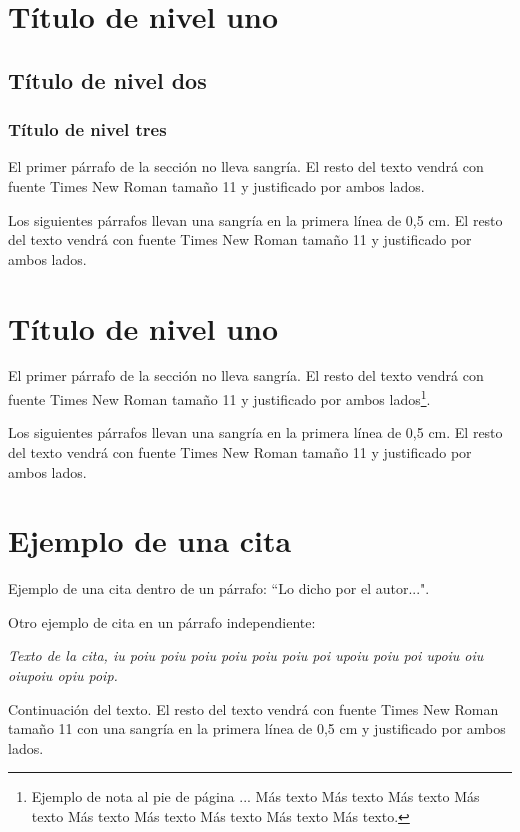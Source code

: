 \documentclass[a4paper,11pt,twocolumn,twoside]{article}
\begin{document}
\section{Título de nivel uno}

\subsection{Título de nivel dos}

\subsubsection{Título de nivel tres}

El primer párrafo de la sección no lleva sangría. El resto del
texto vendrá con fuente Times New Roman tamaño 11 y justificado
por ambos lados.

Los siguientes párrafos llevan una sangría en la primera línea de
0,5 cm. El resto del texto vendrá con fuente Times New Roman
tamaño 11 y justificado por ambos lados.


\section{Título de nivel uno}

El primer párrafo de la sección no lleva sangría. El resto del
texto vendrá con fuente Times New Roman tamaño 11 y justificado
por ambos lados\footnote{Ejemplo de nota al pie de página ... Más
texto Más texto Más texto Más texto Más texto Más texto Más texto
Más texto Más texto.}.

Los siguientes párrafos llevan una sangría en la primera línea de
0,5 cm. El resto del texto vendrá con fuente Times New Roman
tamaño 11 y justificado por ambos lados.

\section{Ejemplo de una cita}

Ejemplo de una cita dentro de un párrafo: ``Lo dicho por el
autor...".

Otro ejemplo de cita en un párrafo independiente:

\parbox{6.5cm}{\textit{Texto de la cita, iu poiu poiu poiu poiu poiu poiu poi
upoiu poiu poi upoiu oiu oiupoiu opiu poip.}}

Continuación del texto. El resto del texto vendrá con fuente
Times New Roman tamaño 11 con una sangría en la primera línea de
0,5 cm y justificado por ambos lados.
\end{document}
